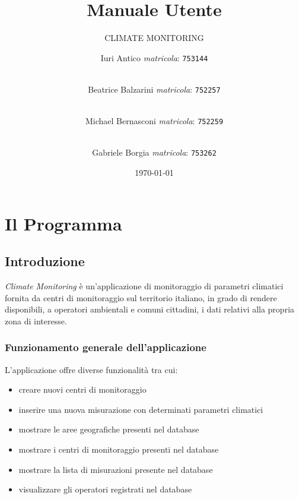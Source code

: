 \documentclass[12pt]{scrreprt}
\title{Manuale Utente}
\subtitle{CLIMATE MONITORING}
\author{
	Iuri Antico \textit{matricola}:
	\texttt{753144}
	\and \\
	Beatrice Balzarini \textit{matricola}:
	\texttt{752257}
	\and \\
	Michael Bernasconi \textit{matricola}:
	\texttt{752259}
	\and \\
	Gabriele Borgia \textit{matricola}:
	\texttt{753262}		
}
\date{\today}
\begin{document}
	\maketitle

	\tableofcontents
	\listoffigures

	\chapter{Il Programma}
	\section{Introduzione}
		\textit{Climate Monitoring} è un'applicazione di monitoraggio di parametri climatici fornita da centri di monitoraggio sul territorio italiano, in grado di rendere disponibili, a operatori ambientali e comuni cittadini, i dati relativi alla propria zona di interesse.
		
		

		\subsection{Funzionamento generale dell'applicazione}
		
		L'applicazione offre diverse funzionalità tra cui:
		\begin{itemize}
			\item creare nuovi centri di monitoraggio
			\item inserire una nuova misurazione con determinati parametri climatici
			\item mostrare le aree geografiche presenti nel database
			\item mostrare i centri di monitoraggio presenti nel database
			\item mostrare la lista di misurazioni presente nel database
			\item visualizzare gli operatori registrati nel database
		\end{itemize}
		
\end{document}
